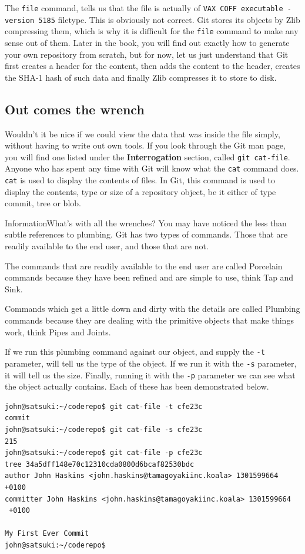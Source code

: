 The \texttt{file} command, tells us that the file is actually of \texttt{VAX COFF executable - version 5185} filetype.
This is obviously not correct.
Git stores its objects by Zlib compressing them, which is why it is difficult for the \texttt{file} command to make any sense out of them.
Later in the book, you will find out exactly how to generate your own repository from scratch, but for now, let us just understand that Git first creates a header for the content, then adds the content to the header, creates the SHA-1 hash of such data and finally Zlib compresses it to store to disk.

\subsection{Out comes the wrench}
Wouldn't it be nice if we could view the data that was inside the file simply, without having to write out own tools.
If you look through the Git man page, you will find one listed under the \textbf{Interrogation} section, called \texttt{git cat-file}.
Anyone who has spent any time with Git will know what the \texttt{cat} command does.
\texttt{cat} is used to display the contents of files.
In Git, this command is used to display the contents, type or size of a repository object, be it either of type commit, tree or blob.

\begin{callout}{Information}{What's with all the wrenches?}
You may have noticed the less than subtle references to plumbing.
Git has two types of commands.
Those that are readily available to the end user, and those that are not.

The commands that are readily available to the end user are called Porcelain commands because they have been refined and are simple to use, think Tap and Sink.

Commands which get a little down and dirty with the details are called Plumbing commands because they are dealing with the primitive objects that make things work, think Pipes and Joints.
\end{callout}

If we run this plumbing command against our object, and supply the \texttt{-t} parameter,  will tell us the type of the object.
If we run it with the \texttt{-s} parameter, it will tell us the size.
Finally, running it with the \texttt{-p} parameter we can see what the object actually contains.
Each of these has been demonstrated below.

\begin{Verbatim}
john@satsuki:~/coderepo$ git cat-file -t cfe23c
commit
john@satsuki:~/coderepo$ git cat-file -s cfe23c
215
john@satsuki:~/coderepo$ git cat-file -p cfe23c
tree 34a5dff148e70c12310cda0800d6bcaf82530bdc
author John Haskins <john.haskins@tamagoyakiinc.koala> 1301599664 +0100
committer John Haskins <john.haskins@tamagoyakiinc.koala> 1301599664
 +0100

My First Ever Commit
john@satsuki:~/coderepo$
\end{Verbatim}

